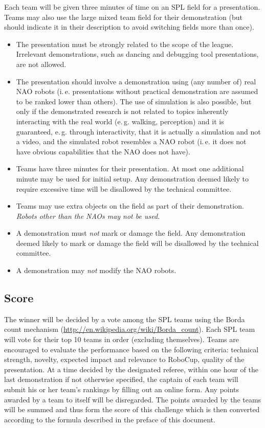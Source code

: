 \documentclass[12pt]{article}
\newcommand{\ie}{\mbox{i.\,e.}\xspace}
\newcommand{\eg}{\mbox{e.\,g.}\xspace}
\begin{document}
Each team will be given three minutes of time on an SPL field for a presentation. Teams may also use the large mixed team field for their demonstration (but should indicate it in their description to avoid switching fields more than once).

\begin{itemize}
\item The presentation must be strongly related to the scope of the league. Irrelevant demonstrations, such as dancing and debugging tool presentations, are not allowed.
\item The presentation should involve a demonstration using (any number of) real NAO robots (\ie presentations without practical demonstration are assumed to be ranked lower than others). The use of simulation is also possible, but only if the demonstrated research is not related to topics inherently interacting with the real world (\eg walking, perception) and it is guaranteed, \eg through interactivity, that it is actually a simulation and not a video, and the simulated robot resembles a NAO robot (\ie it does not have obvious capabilities that the NAO does not have).
\item Teams have three minutes for their presentation. At most one additional minute may be used for initial setup. Any demonstration deemed likely to require excessive time will be disallowed by the technical committee.
\item Teams may use extra objects on the field as part of their demonstration. \emph{Robots other than the NAOs may not be used.}
\item A demonstration must \emph{not} mark or damage the field. Any demonstration deemed likely to mark or damage the field will be disallowed by the technical committee.
\item A demonstration may \emph{not} modify the NAO robots.
\end{itemize}

\subsection{Score}

The winner will be decided by a vote among the SPL teams using the Borda count mechanism (\url{http://en.wikipedia.org/wiki/Borda_count}). Each SPL team will vote for their top 10 teams in order (excluding themselves). Teams are encouraged to evaluate the performance based on the following criteria: technical strength, novelty, expected impact and relevance to RoboCup, quality of the presentation. At a time decided by the designated referee, within one hour of the last demonstration if not otherwise specified, the captain of each team will submit his or her team's rankings by filling out an online form. Any points awarded by a team to itself will be disregarded. The points awarded by the teams will be summed and thus form the score of this challenge which is then converted according to the formula described in the preface of this document.
\end{document}
